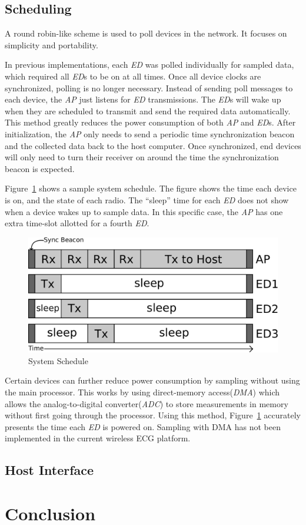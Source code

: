 \documentclass{article}
\begin{document}
\subsection{Scheduling}
A round robin-like scheme is used to poll devices in the network. It focuses on simplicity and portability.

In previous implementations, each \emph{ED} was polled individually for sampled data, which required all \emph{ED}s to be on at all times. Once all device clocks are synchronized, polling is no longer necessary. Instead of sending poll messages to each device, the \emph{AP} just listens for \emph{ED} transmissions. The \emph{ED}s will wake up when they are scheduled to transmit and send the required data automatically. This method greatly reduces the power consumption of both \emph{AP} and \emph{ED}s. After initialization, the \emph{AP} only needs to send a periodic time synchronization beacon and the collected data back to the host computer. Once synchronized, end devices will only need to turn their receiver on around the time the synchronization beacon is expected.

Figure~\ref{fig:system_schedule} shows a sample system schedule. The figure shows the time each device is on, and the state of each radio. The ``sleep'' time for each \emph{ED} does not show when a device wakes up to sample data. In this specific case, the \emph{AP} has one extra time-slot allotted for a fourth \emph{ED}.

\begin{figure}[htb]
\begin{center}
\includegraphics[width=1\textwidth]{figures/sync_schedule.pdf}
\end{center}
\caption{System Schedule}
\label{fig:system_schedule}
\end{figure}

Certain devices can further reduce power consumption by sampling without using the main processor. This works by using direct-memory access(\emph{DMA}) which allows the analog-to-digital converter(\emph{ADC}) to store measurements in memory without first going through the processor. Using this method, Figure~\ref{fig:system_schedule} accurately presents the time each \emph{ED} is powered on. Sampling with DMA has not been implemented in the current wireless ECG platform.

\subsection{Host Interface}


\section{Conclusion}

{}

\end{document}
